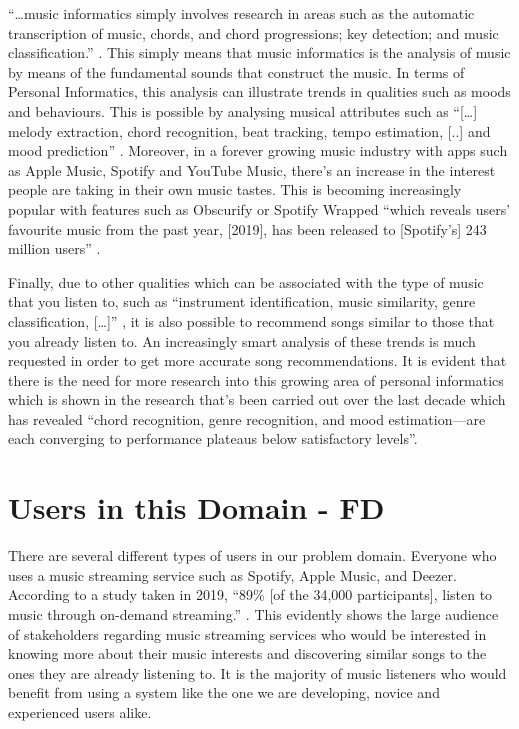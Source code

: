 \documentclass[10pt, notitlepage]{report}
\begin{document}
“…music informatics simply involves research in areas such as the automatic transcription of music, chords, and chord progressions; key detection; and music classification.” \cite{Paas2013}. This simply means that music informatics is the analysis of music by means of the fundamental sounds that construct the music. In terms of Personal Informatics, this analysis can illustrate trends in qualities such as moods and behaviours. This is possible by analysing musical attributes such as “[…] melody extraction, chord recognition, beat tracking, tempo estimation, [..] and mood prediction” \cite{Humphrey2013}.
Moreover, in a forever growing music industry with apps such as Apple Music, Spotify and YouTube Music, there’s an increase in the interest people are taking in their own music tastes. This is becoming increasingly popular with features such as Obscurify or Spotify Wrapped “which reveals users’ favourite music from the past year, [2019], has been released to [Spotify’s] 243 million users” \cite{Izzard2019}.

Finally, due to other qualities which can be associated with the type of music that you listen to, such as “instrument identification, music similarity, genre classification, […]” \cite{Humphrey2013}, it is also possible to recommend songs similar to those that you already listen to. An increasingly smart analysis of these trends is much requested in order to get more accurate song recommendations. It is evident that there is the need for more research into this growing area of personal informatics which is shown in the research that’s been carried out over the last decade which has revealed “chord recognition, genre recognition, and mood estimation—are each converging to performance plateaus below satisfactory levels”\cite{Humphrey2013}.

\section{Users in this Domain - FD}

There are several different types of users in our problem domain. Everyone who uses a music streaming service such as Spotify, Apple Music, and Deezer. According to a study taken in 2019, “89\% [of the 34,000 participants], listen to music through on-demand streaming.” \cite{IFPI2019}. This evidently shows the large audience of stakeholders regarding music streaming services who would be interested in knowing more about their music interests and discovering similar songs to the ones they are already listening to. It is the majority of music listeners who would benefit from using a system like the one we are developing, novice and experienced users alike.
\end{document}
